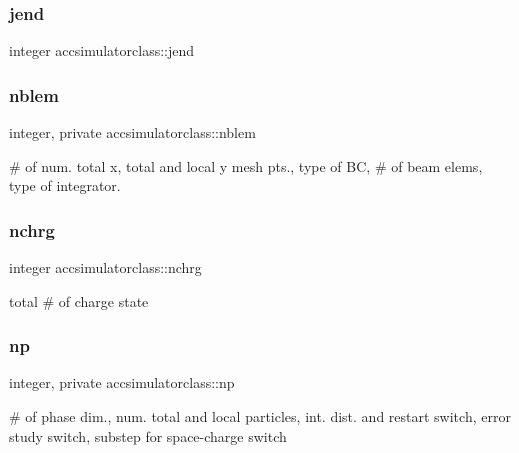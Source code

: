 \subsubsection{\texorpdfstring{jend}{jend}}
{\footnotesize\ttfamily integer accsimulatorclass\+::jend}

\mbox{\label{namespaceaccsimulatorclass_a99e7feb0e1e3adf9ad845a7425a1b9f7}} 
\subsubsection{\texorpdfstring{nblem}{nblem}}
{\footnotesize\ttfamily integer, private accsimulatorclass\+::nblem\hspace{0.3cm}{\ttfamily [private]}}



\# of num. total x, total and local y mesh pts., type of BC, \# of beam elems, type of integrator. 

\mbox{\label{namespaceaccsimulatorclass_ac4f089e8c954990197b1d251b800692f}} 
\subsubsection{\texorpdfstring{nchrg}{nchrg}}
{\footnotesize\ttfamily integer accsimulatorclass\+::nchrg}



total \# of charge state 

\mbox{\label{namespaceaccsimulatorclass_a1149425f2a1942ae90449ee7a0a06fe0}} 
\subsubsection{\texorpdfstring{np}{np}}
{\footnotesize\ttfamily integer, private accsimulatorclass\+::np\hspace{0.3cm}{\ttfamily [private]}}



\# of phase dim., num. total and local particles, int. dist. and restart switch, error study switch, substep for space-\/charge switch 


